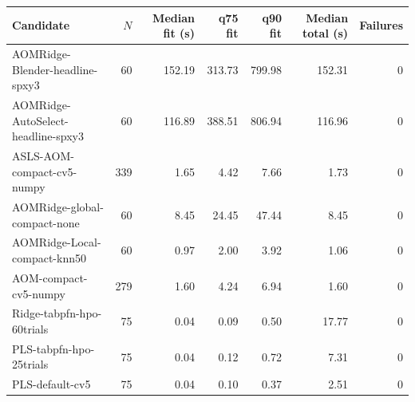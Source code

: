 \begin{tabularx}{\linewidth}{Xrrrrrr}
\toprule
Candidate & $N$ & Median fit (s) & q75 fit & q90 fit & Median total (s) & Failures \\
\midrule
AOMRidge-Blender-headline-spxy3 & 60 & 152.19 & 313.73 & 799.98 & 152.31 & 0 \\
AOMRidge-AutoSelect-headline-spxy3 & 60 & 116.89 & 388.51 & 806.94 & 116.96 & 0 \\
ASLS-AOM-compact-cv5-numpy & 339 & 1.65 & 4.42 & 7.66 & 1.73 & 0 \\
AOMRidge-global-compact-none & 60 & 8.45 & 24.45 & 47.44 & 8.45 & 0 \\
AOMRidge-Local-compact-knn50 & 60 & 0.97 & 2.00 & 3.92 & 1.06 & 0 \\
AOM-compact-cv5-numpy & 279 & 1.60 & 4.24 & 6.94 & 1.60 & 0 \\
Ridge-tabpfn-hpo-60trials & 75 & 0.04 & 0.09 & 0.50 & 17.77 & 0 \\
PLS-tabpfn-hpo-25trials & 75 & 0.04 & 0.12 & 0.72 & 7.31 & 0 \\
PLS-default-cv5 & 75 & 0.04 & 0.10 & 0.37 & 2.51 & 0 \\
\bottomrule
\end{tabularx}
